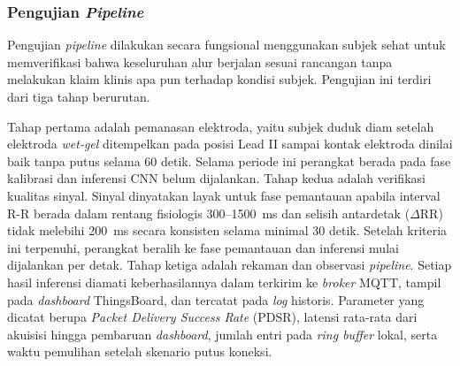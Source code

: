 \subsubsection{Pengujian \textit{Pipeline}}

Pengujian \textit{pipeline} dilakukan secara fungsional menggunakan subjek sehat untuk memverifikasi bahwa keseluruhan alur berjalan sesuai rancangan tanpa melakukan klaim klinis apa pun terhadap kondisi subjek. Pengujian ini terdiri dari tiga tahap berurutan.

Tahap pertama adalah pemanasan elektroda, yaitu subjek duduk diam setelah elektroda \textit{wet-gel} ditempelkan pada posisi Lead II sampai kontak elektroda dinilai baik tanpa putus selama 60 detik. Selama periode ini perangkat berada pada fase kalibrasi dan inferensi CNN belum dijalankan. Tahap kedua adalah verifikasi kualitas sinyal. Sinyal dinyatakan layak untuk fase pemantauan apabila interval R-R berada dalam rentang fisiologis 300--1500~ms dan selisih antardetak (\(\Delta\)RR) tidak melebihi 200~ms secara konsisten selama minimal 30 detik. Setelah kriteria ini terpenuhi, perangkat beralih ke fase pemantauan dan inferensi mulai dijalankan per detak. Tahap ketiga adalah rekaman dan observasi \textit{pipeline}. Setiap hasil inferensi diamati keberhasilannya dalam terkirim ke \textit{broker} MQTT, tampil pada \textit{dashboard} ThingsBoard, dan tercatat pada \textit{log} historis. Parameter yang dicatat berupa \textit{Packet Delivery Success Rate} (PDSR), latensi rata-rata dari akuisisi hingga pembaruan \textit{dashboard}, jumlah entri pada \textit{ring buffer} lokal, serta waktu pemulihan setelah skenario putus koneksi.


